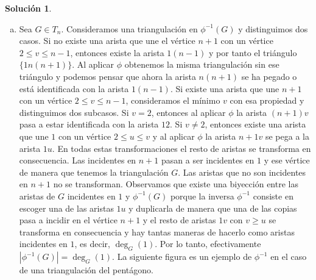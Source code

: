 \documentclass[10pt]{article}
\theoremstyle{definition}
\newtheorem*{sol}{Solución}
\begin{document}
\begin{sol}
\begin{enumerate}[(a)]
\item Sea $G\in T_n$. Consideramos una triangulación en $\phi^{-1}(G)$ y distinguimos dos casos. Si no existe una arista que une el vértice $n+1$ con un vértice $2\leq v\leq n-1$, entonces existe la arista $1(n-1)$ y por tanto el triángulo $\{1n(n+1)\}$. Al aplicar $\phi$ obtenemos la misma triangulación sin ese triángulo y podemos pensar que ahora la arista $n(n+1)$ se ha pegado o está identificada con la arista $1(n-1)$. Si existe una arista que une $n+1$ con un vértice $2\leq v\leq n-1$, consideramos el mínimo $v$ con esa propiedad y distinguimos dos subcasos. Si $v=2$, entonces al aplicar $\phi$ la arista $(n+1)v$ pasa a estar identificada con la arista $12$. Si $v\neq 2$, entonces existe una arista que une $1$ con un vértice $2\leq u\leq v$ y al aplicar $\phi$ la arista $n+1v$ se pega a la arista $1u$. En todas estas transformaciones el resto de aristas se transforma en consecuencia. Las incidentes en $n+1$ pasan a ser incidentes en $1$ y ese vértice de manera que tenemos la triangulación $G$. Las aristas que no son incidentes en $n+1$ no se transforman. Observamos que existe una biyección entre las aristas de $G$ incidentes en $1$ y $\phi^{-1}(G)$ porque la inversa $\phi^{-1}$ consiste en escoger una de las aristas $1u$ y duplicarla de manera que una de las copias pasa a incidir en el vértice $n+1$ y el resto de aristas $1v$ con $v\geq u$ se transforma en consecuencia y hay tantas maneras de hacerlo como aristas incidentes en $1$, es decir, $\deg_G(1)$. Por lo tanto, efectivamente $|\phi^{-1}(G)|=\deg_G(1)$. La siguiente figura es un ejemplo de $\phi^{-1}$ en el caso de una triangulación del pentágono.


\end{enumerate}
\end{sol}
\end{document}
